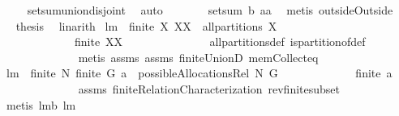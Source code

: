 \begin{isabellebody}
\ \ \isamarkupfalse%
\ {}\ setsum{\isachardot}union{\isacharunderscore}disjoint\ \isamarkupfalse%
\ auto\isanewline
\ \ \isamarkupfalse%
\ \isamarkupfalse%
\ {\isachardoublequoteopen}{\isachardot}{\isachardot}{\isachardot}\ {\isacharequal}\ setsum\ b\ {\isacharquery}aa{\isachardoublequoteclose}\ \isamarkupfalse%
\ {\isacharparenleft}metis\ outsideOutside{\isacharparenright}\isanewline
\ \ \isamarkupfalse%
\ \isamarkupfalse%
\ {\isacharquery}thesis\ \isamarkupfalse%
\ linarith\isanewline
{}\isamarkupfalse%
%
\endisatagproof
{\isafoldproof}%
%
\isadelimproof
\isanewline
%
\endisadelimproof
\isanewline
{}\isamarkupfalse%
\ lm{}{}{\isacharcolon}\ \ {\isachardoublequoteopen}finite\ X{\isachardoublequoteclose}\ {\isachardoublequoteopen}XX\ {\isasymin}\ all{\isacharunderscore}partitions\ X{\isachardoublequoteclose}\ \isanewline
\ \ \ \ \ \ \ \ \ \ \ \ \ {\isachardoublequoteopen}finite\ XX{\isachardoublequoteclose}\ \isanewline
%
\isadelimproof
\ \ \ \ \ \ \ \ \ \ \ \ %
\endisadelimproof
%
\isatagproof
{}\isamarkupfalse%
\ all{\isacharunderscore}partitions{\isacharunderscore}def\ is{\isacharunderscore}partition{\isacharunderscore}of{\isacharunderscore}def\ \isanewline
\ \ \ \ \ \ \ \ \ \ \ \ \isamarkupfalse%
\ {\isacharparenleft}metis\ assms{\isacharparenleft}{}{\isacharparenright}\ assms{\isacharparenleft}{}{\isacharparenright}\ finite{\isacharunderscore}UnionD\ mem{\isacharunderscore}Collect{\isacharunderscore}eq{\isacharparenright}%
\endisatagproof
{\isafoldproof}%
%
\isadelimproof
\isanewline
%
\endisadelimproof
\isanewline
{}\isamarkupfalse%
\ lm{}{}{\isacharcolon}\ \ {\isachardoublequoteopen}finite\ N{\isachardoublequoteclose}\ {\isachardoublequoteopen}finite\ G{\isachardoublequoteclose}\ {\isachardoublequoteopen}a\ {\isasymin}\ possibleAllocationsRel\ N\ G{\isachardoublequoteclose}\isanewline
\ \ \ \ \ \ \ \ \ \ \ \ \ {\isachardoublequoteopen}finite\ a{\isachardoublequoteclose}\ \isanewline
%
\isadelimproof
\ \ \ \ \ \ \ \ \ \ \ \ %
\endisadelimproof
%
\isatagproof
{}\isamarkupfalse%
\ assms\ finiteRelationCharacterization\ rev{\isacharunderscore}finite{\isacharunderscore}subset\ \isamarkupfalse%
\ {\isacharparenleft}metis\ lm{}{}b\ lm{}{}{\isacharparenright}%

\end{isabellebody}
